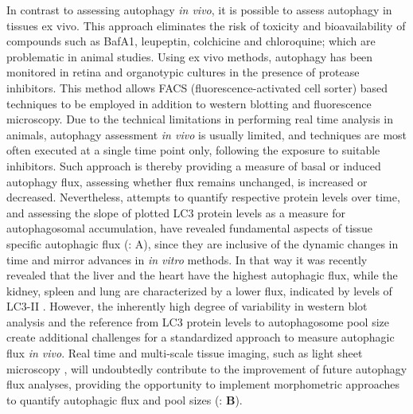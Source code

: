 In contrast to assessing autophagy \textit{in vivo}, it is possible to assess autophagy in tissues ex vivo. This approach eliminates the risk of toxicity and bioavailability of compounds such as BafA1, leupeptin, colchicine and chloroquine; which are problematic in animal studies. Using ex vivo methods, autophagy has been monitored in retina \citep{Esteban-Martinez2015} and organotypic cultures in the presence of protease inhibitors. This method allows FACS (fluorescence-activated cell sorter) based techniques to be employed in addition to western blotting and fluorescence microscopy. Due to the technical limitations in performing real time analysis in animals, autophagy assessment \textit{in vivo} is usually limited, and techniques are most often executed at a single time point only, following the exposure to suitable inhibitors. Such approach is thereby providing a measure of basal or induced autophagy flux, assessing whether flux remains unchanged, is increased or decreased. Nevertheless, attempts to quantify respective protein levels over time, and assessing the slope of plotted LC3 protein levels as a measure for autophagosomal accumulation, have revealed fundamental aspects of tissue specific autophagic flux \citep{Haspel2011} (: A), since they are inclusive of the dynamic changes in time and mirror advances in \textit{in vitro} methods. In that way it was recently revealed that the liver and the heart have the highest autophagic flux, while the kidney, spleen and lung are characterized by a lower flux, indicated by levels of LC3-II \citep{Haspel2011}. However, the inherently high degree of variability in western blot analysis and the reference from LC3 protein levels to autophagosome pool size create additional challenges for a standardized approach to measure autophagic flux \textit{in vivo}. Real time and multi-scale tissue imaging, such as light sheet microscopy \citep{Pampaloni2013}, will undoubtedly contribute to the improvement of future autophagy flux analyses, providing the opportunity to implement morphometric approaches to quantify autophagic flux and pool sizes (: \textbf{B}). 

